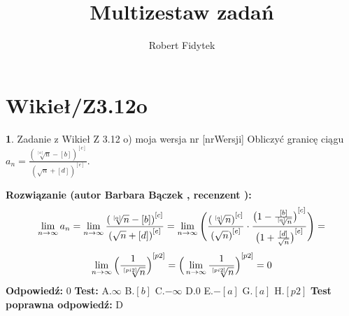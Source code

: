\documentclass[12pt, a4paper]{article}
\title{Multizestaw zadań}
\author{Robert Fidytek}
\date{}
\theoremstyle{definition} %
\newtheorem{zad}{}
\newcommand{\kategoria}[1]{\section{#1}} %
\newcommand{\zadStart}[1]{\begin{zad}#1\newline} %
\newcommand{\zadStop}{\end{zad}}   %
\newcommand{\rozwStart}[2]{\noindent \textbf{Rozwiązanie (autor #1 , recenzent #2): }\newline} %
\newcommand{\rozwStop}{\newline}                                            %
\newcommand{\odpStart}{\noindent \textbf{Odpowiedź:}\newline}    %
\newcommand{\odpStop}{\newline}                                             %
\newcommand{\testStart}{\noindent \textbf{Test:}\newline} %
\newcommand{\testStop}{\newline} %
\newcommand{\kluczStart}{\noindent \textbf{Test poprawna odpowiedź:}\newline} %
\newcommand{\kluczStop}{\newline} %
\begin{document}
\maketitle


\kategoria{Wikieł/Z3.12o}
\zadStart{Zadanie z Wikieł Z 3.12 o) moja wersja nr [nrWersji]}
Obliczyć granicę ciągu $a_n= \frac{{(\sqrt[{[a]}]{n} -[b])}^{[c]}}{{(\sqrt{n}+[d])}^{[e]}}$.
\zadStop
\rozwStart{Barbara Bączek}{}
$$\lim_{n \rightarrow \infty} a_n= \lim_{n \rightarrow \infty} \frac{{(\sqrt[{[a]}]{n} -[b])}^{[c]}}{{(\sqrt{n}+[d])}^{[e]}}=  \lim_{n \rightarrow \infty} \Bigg{(} \frac{{(\sqrt[{[a]}]{n})}^{[c]}}{{(\sqrt{n})}^{[e]}} \cdot \frac{{\big{(}1-\frac{[b]}{\sqrt[{[a]}]{n}}\big{)}}^{[c]}}{{\big{(}1+\frac{[d]}{\sqrt{n}}\big{)}}^{[e]}} \Bigg{)}=$$
$$\lim_{n \rightarrow \infty} {\Big{(}\frac{1}{\sqrt[{[pi2]}]{n}} \Big{)}}^{[p2]} ={\Big{(}\lim_{n \rightarrow \infty} \frac{1}{\sqrt[{[pi2]}]{n}} \Big{)}}^{[p2]}
=0$$
\rozwStop
\odpStart
$0$
\odpStop
\testStart
A.$\infty$
B.$[b]$
C.$-\infty$
D.$0$
E.$-[a]$
G.$[a]$
H.$[p2]$
\testStop
\kluczStart
D
\kluczStop
\end{document}
